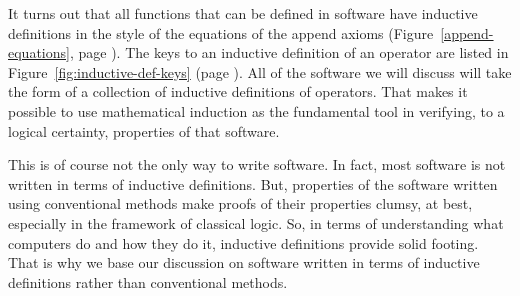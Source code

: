 It turns out that all functions that can be defined in software
have inductive definitions in the style of the equations
of the append axioms (Figure~\ref{append-equations}, page \pageref{append-equations}).
The keys to an inductive definition of an operator are  listed in
Figure~\ref{fig:inductive-def-keys} (page \pageref{fig:inductive-def-keys}).
All of the software we will discuss will take the form of a collection
of inductive definitions of operators.
That makes it possible to use mathematical induction as
the fundamental tool in verifying, to a logical certainty,
properties of that software.

This is of course not the only way to write software.
In fact, most software is not written in terms of inductive definitions.
But, properties of the software written using conventional methods
make
proofs of their properties clumsy, at best, especially in the framework of classical logic.
So, in terms of understanding what computers do and how they do it,
inductive definitions provide solid footing.
That is why we base our discussion on software written
in terms of inductive definitions rather than conventional methods.


